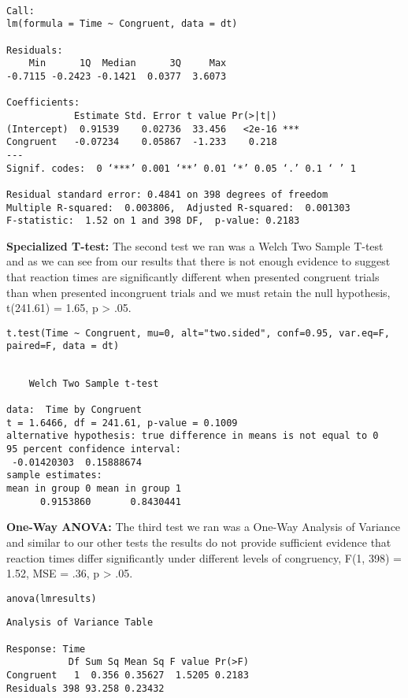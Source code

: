 \documentclass{article}
\begin{document}
\begin{verbatim}

Call:
lm(formula = Time ~ Congruent, data = dt)

Residuals:
    Min      1Q  Median      3Q     Max 
-0.7115 -0.2423 -0.1421  0.0377  3.6073 

Coefficients:
            Estimate Std. Error t value Pr(>|t|)    
(Intercept)  0.91539    0.02736  33.456   <2e-16 ***
Congruent   -0.07234    0.05867  -1.233    0.218    
---
Signif. codes:  0 ‘***’ 0.001 ‘**’ 0.01 ‘*’ 0.05 ‘.’ 0.1 ‘ ’ 1

Residual standard error: 0.4841 on 398 degrees of freedom
Multiple R-squared:  0.003806,	Adjusted R-squared:  0.001303 
F-statistic:  1.52 on 1 and 398 DF,  p-value: 0.2183
\end{verbatim}

\vspace{2em} \textbf{Specialized T-test:} The second test we ran was a Welch Two Sample T-test and as we can see from our results that there is not enough evidence to suggest that reaction times are significantly different when presented congruent trials than when presented incongruent trials and we must retain the null hypothesis, t(241.61) = 1.65, p > .05.
\begin{verbatim}
t.test(Time ~ Congruent, mu=0, alt="two.sided", conf=0.95, var.eq=F, paired=F, data = dt)
\end{verbatim}

\begin{verbatim}

	Welch Two Sample t-test

data:  Time by Congruent
t = 1.6466, df = 241.61, p-value = 0.1009
alternative hypothesis: true difference in means is not equal to 0
95 percent confidence interval:
 -0.01420303  0.15888674
sample estimates:
mean in group 0 mean in group 1 
      0.9153860       0.8430441
\end{verbatim}

\vspace{2em} \textbf{One-Way ANOVA:} The third test we ran was a One-Way Analysis of Variance and similar to our other tests the results do not provide sufficient evidence that reaction times differ significantly under different levels of congruency, F(1, 398) = 1.52, MSE = .36, p > .05.
\begin{verbatim}
anova(lmresults)
\end{verbatim}

\begin{verbatim}
Analysis of Variance Table

Response: Time
           Df Sum Sq Mean Sq F value Pr(>F)
Congruent   1  0.356 0.35627  1.5205 0.2183
Residuals 398 93.258 0.23432
\end{verbatim}
\end{document}

